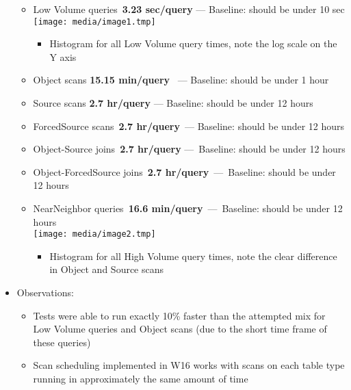 \begin{itemize}
  \begin{itemize}
  \item
    Low Volume queries~\textbf{3.23 sec/query} --- Baseline: should be
    under 10
    sec\\[2\baselineskip]\texttt{[image: media/image1.tmp]}

    \begin{itemize}
    \item
      Histogram for all Low Volume query times, note the log scale on
      the Y axis
    \end{itemize}
  \item
    Object scans \textbf{15.15 min/query} ~--- Baseline: should be under
    1 hour
  \item
    Source scans \textbf{2.7 hr/query} --- Baseline: should be under 12
    hours
  \item
    ForcedSource scans~\textbf{2.7 hr/query}~--- Baseline: should be
    under 12 hours
  \item
    Object-Source joins~\textbf{2.7 hr/query} ---~Baseline: should be
    under 12 hours
  \item
    Object-ForcedSource joins~\textbf{2.7 hr/query}~---~Baseline: should
    be under 12 hours
  \item
    NearNeighbor queries~\textbf{16.6 min/query}~---~Baseline: should be
    under 12
    hours\\[2\baselineskip]\texttt{[image: media/image2.tmp]}

    \begin{itemize}
    \item
      Histogram for all High Volume query times, note the clear
      difference in Object and Source scans
    \end{itemize}
  \end{itemize}
\item
  Observations:

  \begin{itemize}
  \item
    Tests were able to run exactly 10\% faster than the attempted mix
    for Low Volume queries and Object scans (due to the short time frame
    of these queries)
  \item
    Scan scheduling implemented in W16 works with scans on each table
    type running in approximately the same amount of time


\end{itemize}
\end{itemize}

